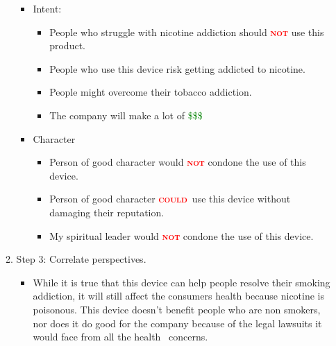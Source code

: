 \documentclass[a4paper, 10pt]{article}
\newcommand{\important}[1]{\textcolor{red}{\textbf{\textsc{#1}}}}
\begin{document}
\begin{enumerate}
\begin{enumerate}
\begin{itemize}
								\item Intent:
								\begin{itemize}
									\item People who struggle with nicotine addiction should \important{not} use this product.
									\item People who use this device risk getting addicted to nicotine.
									\item People might overcome their tobacco addiction.
									\item The company will make a lot of \textcolor{green}{\$\$\$}
								\end{itemize}
							
								\item Character
								\begin{itemize}
									\item Person of good character would \important{not} condone the use of this device.
									\item Person of good character \important{could}~use this device without damaging their reputation.
									\item My spiritual leader would \important{not} condone the use of this device.
								\end{itemize}
							
							\end{itemize}
							
							\pagebreak
							\item Step 3: Correlate perspectives.
							\begin{itemize}
								\item While it is true that this device can help people resolve their smoking addiction, it will still affect the consumers health because nicotine is poisonous.
								\noindent This device doesn't benefit people who are non smokers, nor does it do good for the company because of the legal lawsuits it would face from all the health
								\noindent~concerns.
							\end{itemize}
						

\end{enumerate}
\end{enumerate}
\end{document}
